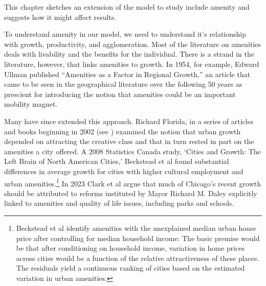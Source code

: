  

 This chapter sketches an extension of the model to study include \gls{amenity} and suggests how it might affect results.

To understand amenity in our model, we need to understand it's relationship with growth, productivity, and agglomeration. Most of the literature on amenities deals with livability and the benefits for the individual. There is a strand in the literature, however, that links amenities to  growth. In 1954, for example, Edward Ullman \cite{ullmanAmenitiesFactorRegional1954} published  ``Amenities as a Factor in Regional Growth,'' an article that came to be seen in the geographical literature over the following 50 years as prescient \cite{walcottCommentsEdwardUllman2010} for introducing the notion that amenities could be an important mobility magnet. 

Many have since extended this approach. Richard Florida, in a series of articles and books beginning in 2002 (see \cite{floridaCreativeClassEconomic2014}) examined the notion that urban growth depended on attracting  the creative class and that in turn rested in part on the amenities a city offered. A 2008  Statistics Canada study, `Cities and Growth: The Left Brain of North American Cities,' Beckstead et al  \cite{becksteadCitiesGrowthLeft2008} found substantial differences in average growth for cities with higher cultural employment and urban amenities.\footnote{Beckstead et al identify amenities with the unexplained median urban house price after controlling for median household income:  The basic premise would be that after conditioning on household income, variation in home prices across cities would be a function of the relative attractiveness of these places. The residuals  yield a continuous ranking of cities based on the estimated variation in urban amenities.} 
In 2023 Clark et al \cite{clarkAmenitiesDriveUrban2002} argue that much of Chicago's recent growth  should be attributed to reforms instituted by Mayor Richard M.  Daley  explicitly linked to amenities and quality of life issues, including parks and schools.


